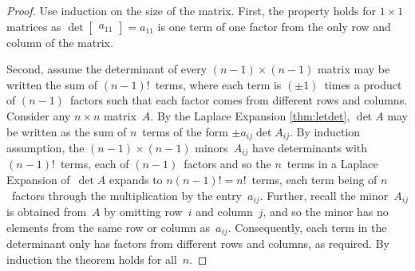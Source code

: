 \begin{proof} 
Use induction on the size of the matrix.
First, the property holds for \(1\times 1\) matrices as \(\det\begin{bmatrix} a_{11} \end{bmatrix}=a_{11}\) is one term of one factor from the only row and column of the matrix.

Second, assume the determinant of every \((n-1)\times (n-1)\) matrix may be written the sum of \((n-1)!\)~terms, where each term is \((\pm1)\)~times a product of \((n-1)\)~factors such that each factor comes from different rows and columns.
Consider any \(n\times n\) matrix~\(A\).
By the Laplace Expansion \cref{thm:letdet}, \(\det A\) may be written as the sum of \(n\)~terms of the form \(\pm a_{ij}\det A_{ij}\).
By induction assumption, the \((n-1)\times(n-1)\) minors~\(A_{ij}\) have determinants with \((n-1)!\)~terms, each of \((n-1)\)~factors and so the \(n\)~terms in a Laplace Expansion of~\(\det A\) expands to \(n(n-1)!=n!\)~terms, each term being of \(n\)~factors through the multiplication by the entry~\(a_{ij}\).
Further, recall the minor~\(A_{ij}\) is obtained from~\(A\) by omitting row~\(i\) and column~\(j\), and so the minor has no elements from the same row or column as~\(a_{ij}\).
Consequently, each term in the determinant only has factors from different rows and columns, as required.
By induction the theorem holds for all~\(n\).
\end{proof}





\begin{comment}
\nakos{} has an interesting section on using determinants to fit some interesting curves, and other determinant uses: such material could go here.
\end{comment}






\sectionExercises




